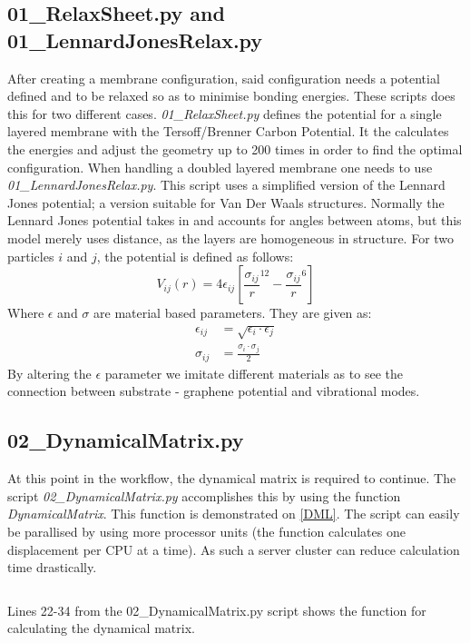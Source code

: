 \subsection{01\_RelaxSheet.py and 01\_LennardJonesRelax.py}\label{01}
After creating a membrane configuration, said configuration needs a potential defined and to be relaxed so as to minimise bonding energies. These scripts does this for two different cases. \textit{01\_RelaxSheet.py} defines the potential for a single layered membrane with the Tersoff/Brenner Carbon Potential\cite{Lindsay2010}. It the calculates the energies and adjust the geometry up to 200 times in order to find the optimal configuration. When handling a doubled layered membrane one needs to use \textit{01\_LennardJonesRelax.py}. This script uses a simplified version of the Lennard Jones potential; a version suitable for Van Der Waals structures. Normally the Lennard Jones potential takes in and accounts for angles between atoms, but this model merely uses distance, as the layers are homogeneous in structure. For two particles $i$ and $j$, the potential is defined as follows:
\begin{equation}
  V_{ij}(r) = 4 \epsilon_{ij} \left[ \frac{\sigma_{ij}}{r}^{12} - \frac{\sigma_{ij}}{r}^6 \right]
\end{equation}
Where $\epsilon$ and $\sigma$ are material based parameters. They are given as:
\begin{align}
  \epsilon_{ij} & = \sqrt{\epsilon_i \cdot \epsilon_j} \\
  \sigma_{ij} & = \frac{\sigma_i \cdot \sigma_j}{2}
\end{align}
By altering the $\epsilon$ parameter we imitate different materials as to see the connection between substrate - graphene potential and vibrational modes.
\subsection{02\_DynamicalMatrix.py}\label{02}
At this point in the workflow, the dynamical matrix is required to continue. The script \textit{02\_DynamicalMatrix.py} accomplishes this by using the function \textit{DynamicalMatrix}. This function is demonstrated on \cref{DML}. The script can easily be parallised by using more processor units (the function calculates one displacement per CPU at a time). As such a server cluster can reduce calculation time drastically.
\onecolumngrid

\begin{listing}[H]
 \inputminted[python3=true,bgcolor=Black,linenos=true,firstline=22,lastline=34]{python}{VNL/PythonScripts/Scripts/02_DynamicalMatrix.py}
 \caption{Lines 22-34 from the 02\_DynamicalMatrix.py script shows the function for calculating the dynamical matrix.}
 \label{DML}
\end{listing}
\twocolumngrid
